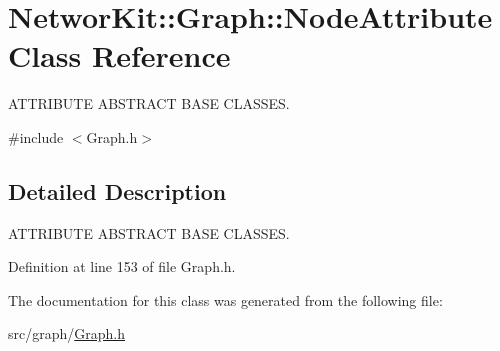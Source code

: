 \hypertarget{class_networ_kit_1_1_graph_1_1_node_attribute}{\section{Networ\-Kit\-:\-:Graph\-:\-:Node\-Attribute Class Reference}
\label{class_networ_kit_1_1_graph_1_1_node_attribute}
}


A\-T\-T\-R\-I\-B\-U\-T\-E A\-B\-S\-T\-R\-A\-C\-T B\-A\-S\-E C\-L\-A\-S\-S\-E\-S.  




{\ttfamily \#include $<$Graph.\-h$>$}



\subsection{Detailed Description}
A\-T\-T\-R\-I\-B\-U\-T\-E A\-B\-S\-T\-R\-A\-C\-T B\-A\-S\-E C\-L\-A\-S\-S\-E\-S. 

Definition at line 153 of file Graph.\-h.



The documentation for this class was generated from the following file\-:\begin{DoxyCompactItemize}
\item 
src/graph/\hyperlink{_graph_8h}{Graph.\-h}\end{DoxyCompactItemize}
